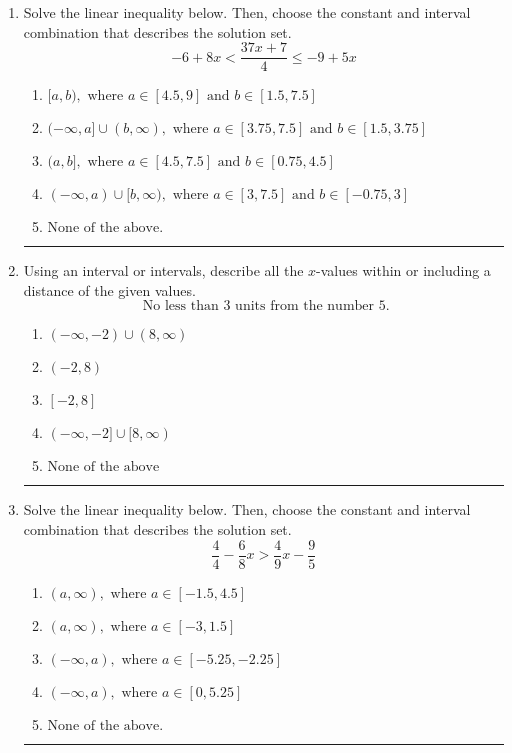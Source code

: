 \documentclass[14pt]{extbook}
\newcommand{\litem}[1]{\item#1\hspace*{-1cm}\rule{\textwidth}{0.4pt}}
\begin{document}
\begin{enumerate}
{\begin{enumerate}[label=\Alph*.]
\end{enumerate} }
\litem{
Solve the linear inequality below. Then, choose the constant and interval combination that describes the solution set.\[ -6 + 8 x < \frac{37 x + 7}{4} \leq -9 + 5 x \]\begin{enumerate}[label=\Alph*.]
\item \( [a, b), \text{ where } a \in [4.5, 9] \text{ and } b \in [1.5, 7.5] \)
\item \( (-\infty, a] \cup (b, \infty), \text{ where } a \in [3.75, 7.5] \text{ and } b \in [1.5, 3.75] \)
\item \( (a, b], \text{ where } a \in [4.5, 7.5] \text{ and } b \in [0.75, 4.5] \)
\item \( (-\infty, a) \cup [b, \infty), \text{ where } a \in [3, 7.5] \text{ and } b \in [-0.75, 3] \)
\item \( \text{None of the above.} \)

\end{enumerate} }
\litem{
Using an interval or intervals, describe all the $x$-values within or including a distance of the given values.\[ \text{ No less than } 3 \text{ units from the number } 5. \]\begin{enumerate}[label=\Alph*.]
\item \( (-\infty, -2) \cup (8, \infty) \)
\item \( (-2, 8) \)
\item \( [-2, 8] \)
\item \( (-\infty, -2] \cup [8, \infty) \)
\item \( \text{None of the above} \)

\end{enumerate} }
\litem{
Solve the linear inequality below. Then, choose the constant and interval combination that describes the solution set.\[ \frac{4}{4} - \frac{6}{8} x > \frac{4}{9} x - \frac{9}{5} \]\begin{enumerate}[label=\Alph*.]
\item \( (a, \infty), \text{ where } a \in [-1.5, 4.5] \)
\item \( (a, \infty), \text{ where } a \in [-3, 1.5] \)
\item \( (-\infty, a), \text{ where } a \in [-5.25, -2.25] \)
\item \( (-\infty, a), \text{ where } a \in [0, 5.25] \)
\item \( \text{None of the above}. \)


\end{enumerate}}
\end{enumerate}
\end{document}
